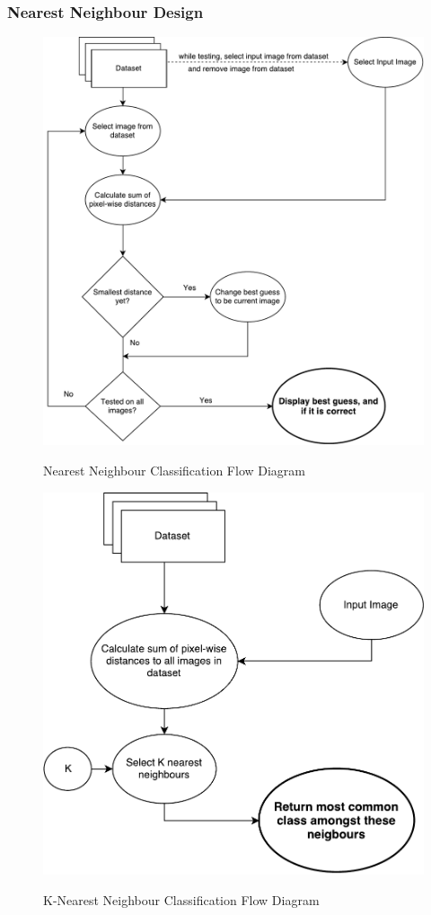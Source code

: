 \subsubsection{Nearest Neighbour Design}
\begin{figure}
\centering
\includegraphics[width=\textwidth]{figures/nearest-neighbour}
\label{fig:nn}
\caption{Nearest Neighbour Classification Flow Diagram}
\centering
\end{figure}

\begin{figure}
	\centering
	\includegraphics[width=\textwidth]{figures/KNN}
	\label{fig:knn}
	\caption{K-Nearest Neighbour Classification Flow Diagram}
	\centering
\end{figure}

